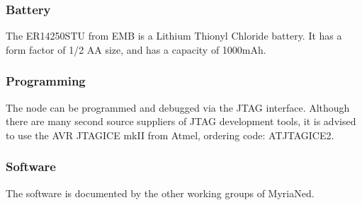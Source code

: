 \documentclass[a4paper,10pt]{report}
\begin{document}
\subsubsection{Battery}
The ER14250STU from EMB is a Lithium Thionyl Chloride battery. It has a form factor of 1/2 AA size, and has a capacity of 1000mAh.
\subsubsection{Programming}
The node can be programmed and debugged via the JTAG interface. Although there are many second source suppliers of JTAG development tools, it is advised to use the AVR JTAGICE mkII from Atmel, ordering code: ATJTAGICE2.
\subsubsection{Software}
The software is documented by the other working groups of MyriaNed.
\end{document}

